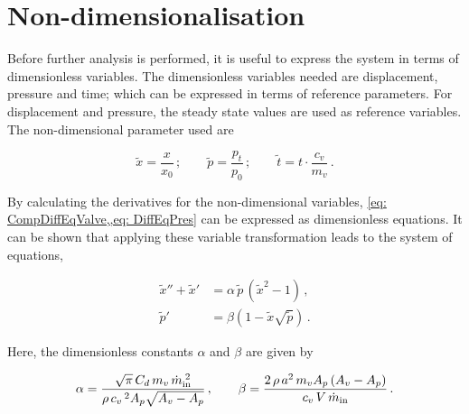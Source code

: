 \section{Non-dimensionalisation}

Before further analysis is performed, it is useful to express the system in terms of dimensionless variables. The dimensionless variables needed are displacement, pressure and time; which can be expressed in terms of reference parameters. For displacement and pressure, the steady state values are used as reference variables. The non-dimensional parameter used are

\begin{equation} \label{eq: BadDimensionlessVar}
    \tilde{x} = \frac{x}{x_{0}} \, ; \qquad
    \tilde{p} = \frac{p_t}{p_{0}} \, ; \qquad 
    \tilde{t} = t \cdot \frac{c_v}{m_v} \, .
\end{equation}



By calculating the derivatives for the non-dimensional variables, \cref{eq: CompDiffEqValve,,eq: DiffEqPres} can be expressed as dimensionless equations. It can be shown that applying these variable transformation leads to the system of equations,

\begin{equation} \label{eq: Non-DimODE}
\begin{split}
    \tilde{x}'' + \tilde{x}' &= \alpha \, \tilde{p} \, \left( \tilde{x}^2 - 1 \right) \, ,\\
    \tilde{p}' &= \beta \left( 1 - \tilde{x} \sqrt{\tilde{p}} \right) \, .
\end{split}
\end{equation}

Here, the dimensionless constants $\alpha$ and $\beta$ are given by

\begin{equation*}
    \alpha = %
    \frac{\sqrt{\pi} \, C_d \, m_v \, \dot{m}_{\rm{in}}\power{2}}{\rho \, c_v\,^2 A_p \sqrt{A_v - A_p}} \, , %
    \qquad
    \beta = %
    \frac{ 2 \, \rho \, a^2 \, m_v A_p \left( A_v - A_p \right) }{ c_v \, V \, \dot{m}_{\rm{in}} } \, .
\end{equation*}

